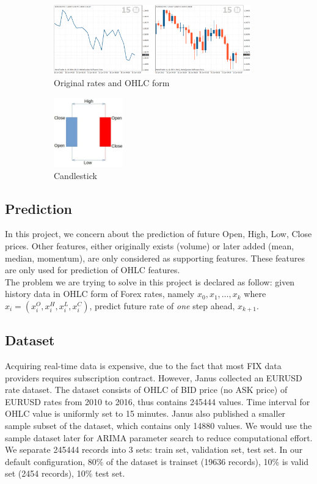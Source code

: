 \documentclass[11pt]{article}
\begin{document}
\begin{figure}
    \begin{subfigure}[b]{0.5\textwidth}
      \includegraphics[height=3cm]{figs/ohlc.png}
      \caption{Original rates and OHLC form}
    \end{subfigure}
    \quad\quad\quad\quad\quad\quad\quad
    \begin{subfigure}[b]{0.2\textwidth}
      \includegraphics[height=3cm]{figs/candle.png}
      \caption{Candlestick}
    \end{subfigure}
    \caption{}
\end{figure}

\subsection{Prediction}
In this project, we concern about the prediction of future Open, High, Low,
Close prices. Other features, either originally exists (volume) or later added
(mean, median, momentum), are only considered as supporting features. These
features are only used for prediction of OHLC features.\\
The problem we are trying to solve in this project is declared as follow: given
history data in OHLC form of Forex rates, namely $x_0, x_1,\ldots,x_k$ where
$x_i=(x^O_i, x^H_i, x^L_i, x^C_i )$, predict future rate of \textit{one} step
ahead, $x_{k+1}$. 

\subsection{Dataset}
Acquiring real-time data is expensive, due to the fact that most FIX data
providers requires subscription contract. However, Janus \cite{meehau16eurusd}
collected an EURUSD rate dataset. The dataset consists of OHLC of BID price (no
ASK price) of EURUSD rates from 2010 to 2016, thus contains 245444 values. Time
interval for OHLC value is uniformly set to 15 minutes. Janus also published a
smaller sample subset of the dataset, which contains only 14880 values. We would
use the sample dataset later for ARIMA parameter search to reduce computational
effort.\\
We separate 245444 records into 3 sets: train set, validation set, test set. In
our default configuration, 80\% of the dataset is trainset (19636 records), 10\%
is valid set (2454 records), 10\% test set.\\
\end{document}
